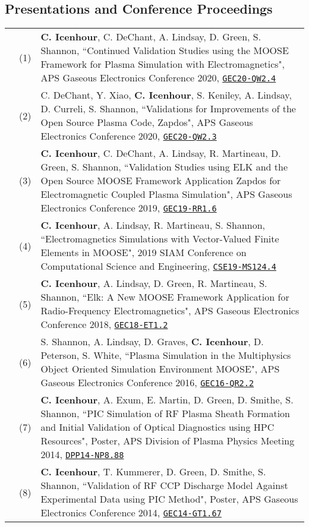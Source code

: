 \documentclass{article}
\begin{document}
\subsection*{Presentations and Conference Proceedings}

	\begin{tabularx}{\textwidth}{l l X}
		\hspace{2em}
      & (1)  & \textbf{C. Icenhour}, C. DeChant, A. Lindsay, D. Green, S. Shannon, ``Continued Validation Studies using the MOOSE Framework for Plasma Simulation with Electromagnetics", APS Gaseous Electronics Conference 2020, \href{https://meetings.aps.org/Meeting/GEC20/Session/QW2.4}{\texttt{GEC20-QW2.4}} \\
      & (2)  & C. DeChant, Y. Xiao, \textbf{C. Icenhour}, S. Keniley, A. Lindsay, D. Curreli, S. Shannon, ``Validations for Improvements of the Open Source Plasma Code, Zapdos", APS Gaseous Electronics Conference 2020, \href{https://meetings.aps.org/Meeting/GEC20/Session/QW2.3}{\texttt{GEC20-QW2.3}} \\
			& (3)  & \textbf{C. Icenhour}, C. DeChant, A. Lindsay, R. Martineau, D. Green, S. Shannon, ``Validation Studies using ELK and the Open Source MOOSE Framework Application Zapdos for Electromagnetic Coupled Plasma Simulation", APS Gaseous Electronics Conference 2019, \href{http://meetings.aps.org/Meeting/GEC19/Session/RR1.6}{\texttt{GEC19-RR1.6}} \\
			& (4)  & \textbf{C. Icenhour}, A. Lindsay, R. Martineau, S. Shannon, ``Electromagnetics Simulations with Vector-Valued Finite Elements in MOOSE", 2019 SIAM Conference on Computational Science and Engineering, \href{http://meetings.siam.org/sess/dsp_talk.cfm?p=96892}{\texttt{CSE19-MS124.4}} \\
			& (5)  & \textbf{C. Icenhour}, A. Lindsay, D. Green, R. Martineau, S. Shannon, ``Elk: A New MOOSE Framework Application for Radio-Frequency Electromagnetics", APS Gaseous Electronics Conference 2018, \href{http://meetings.aps.org/link/BAPS.2018.GEC.ET1.2}{\texttt{GEC18-ET1.2}} \\
			& (6)  &  S. Shannon, A. Lindsay, D. Graves, \textbf{C. Icenhour}, D. Peterson, S. White, ``Plasma Simulation in the Multiphysics Object Oriented Simulation Environment MOOSE", APS Gaseous Electronics Conference 2016, \href{http://meetings.aps.org/link/BAPS.2016.GEC.QR2.2}{\texttt{GEC16-QR2.2}} \\
			& (7)  & \textbf{C. Icenhour}, A. Exum, E. Martin, D. Green, D. Smithe, S. Shannon, ``PIC Simulation of RF Plasma Sheath Formation and Initial Validation of Optical Diagnostics using HPC Resources", Poster, APS Division of Plasma Physics Meeting 2014, \href{http://meetings.aps.org/link/BAPS.2014.DPP.NP8.88}{\texttt{DPP14-NP8.88}} \\
			& (8)  & \textbf{C. Icenhour}, T. Kummerer, D. Green, D. Smithe, S. Shannon, ``Validation of RF CCP Discharge Model Against Experimental Data using PIC Method", Poster, APS Gaseous Electronics Conference 2014, \href{http://meetings.aps.org/link/BAPS.2014.GEC.GT1.67}{\texttt{GEC14-GT1.67}}
	\end{tabularx}
\end{document}
